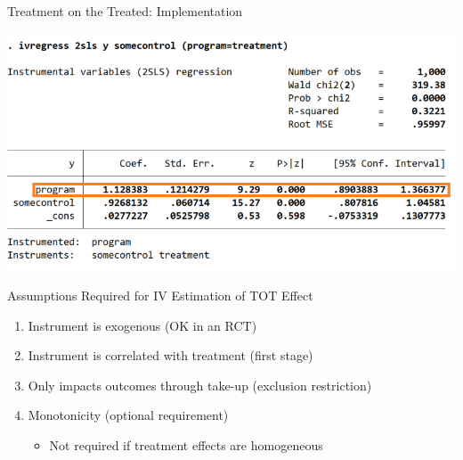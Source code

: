 \documentclass[10pt,xcolor=table,ignorenonframetext,aspectratio=169]{beamer}
\newlength{\wideitemsep}
\let\olditem\item
\renewcommand{\item}{\setlength{\itemsep}{\wideitemsep}\olditem}
\begin{document}
\begin{frame}{Treatment on the Treated:  Implementation}

\medskip
\begin{center}
	\includegraphics[width=\textwidth]{img/StataIV2.png}
\end{center}

\end{frame}




\begin{frame}{Assumptions Required for IV Estimation of TOT Effect}

\medskip
\begin{enumerate}
	
	\item Instrument is exogenous (OK in an RCT)
	
	\item Instrument is correlated with treatment (first stage)
	
	\item Only impacts outcomes through take-up (exclusion restriction)
	
	\item Monotonicity (optional requirement)
	
	\medskip
	\begin{itemize}
		
		\item Not required if treatment effects are homogeneous
		
	\end{itemize}
	
\end{enumerate}


\end{frame}
\end{document}
